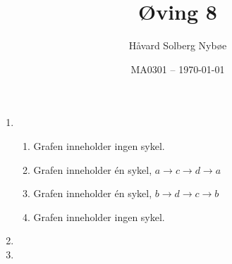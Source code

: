 \documentclass[a4paper, 12pt]{article}  %
\title{Øving 8}                         %
\author{Håvard Solberg Nybøe}           %
\date{MA0301 -- \today}                 %
\begin{document}
\maketitle

\begin{enumerate}
    \item [\boxed{1}]
          \begin{enumerate}
              \item Grafen inneholder ingen sykel.
              \item Grafen inneholder én sykel, \(a \rightarrow c \rightarrow d \rightarrow a\)
              \item Grafen inneholder én sykel, \(b \rightarrow d \rightarrow c \rightarrow b\)
              \item Grafen inneholder ingen sykel.
          \end{enumerate}
    \item [\boxed{2}]
    \item

\end{enumerate}

\end{document}
